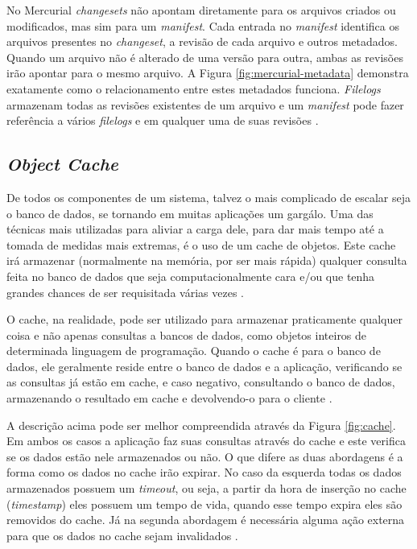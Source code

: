 \documentclass[diss]{template/setrem}
\begin{document}
No Mercurial \emph{changesets} não apontam diretamente para os arquivos criados ou modificados, mas sim para um \emph{manifest}. Cada entrada no \emph{manifest} identifica os arquivos presentes no \emph{changeset}, a revisão de cada arquivo e outros metadados. Quando um arquivo não é alterado de uma versão para outra, ambas as revisões irão apontar para o mesmo arquivo. A Figura \ref{fig:mercurial-metadata} demonstra exatamente como o relacionamento entre estes metadados funciona. \emph{Filelogs} armazenam todas as revisões existentes de um arquivo e um \emph{manifest} pode fazer referência a vários \emph{filelogs} e em qualquer uma de suas revisões \citep{OSullivan2009}.

\subsection{\emph{Object Cache}}
De todos os componentes de um sistema, talvez o mais complicado de escalar seja o banco de dados, se tornando em muitas aplicações um gargálo. Uma das técnicas mais utilizadas para aliviar a carga dele, para dar mais tempo até a tomada de medidas mais extremas, é o uso de um cache de objetos. Este cache irá armazenar (normalmente na memória, por ser mais rápida) qualquer consulta feita no banco de dados que seja computacionalmente cara e/ou que tenha grandes chances de ser requisitada várias vezes \citep{Abbott2011}.

O cache, na realidade, pode ser utilizado para armazenar praticamente qualquer coisa e não apenas consultas a bancos de dados, como objetos inteiros de determinada linguagem de programação. Quando o cache é para o banco de dados, ele geralmente reside entre o banco de dados e a aplicação, verificando se as consultas já estão em cache, e caso negativo, consultando o banco de dados, armazenando o resultado em cache e devolvendo-o para o cliente \citep{Abbott2011}.

A descrição acima pode ser melhor compreendida através da Figura \ref{fig:cache}. Em ambos os casos a aplicação faz suas consultas através do cache e este verifica se os dados estão nele armazenados ou não. O que difere as duas abordagens é a forma como os dados no cache irão expirar. No caso da esquerda todas os dados armazenados possuem um \emph{timeout}, ou seja, a partir da hora de inserção no cache (\emph{timestamp}) eles possuem um tempo de vida, quando esse tempo expira eles são removidos do cache. Já na segunda abordagem é necessária alguma ação externa para que os dados no cache sejam invalidados \citep{Schlossnagle2006}.
\end{document}
